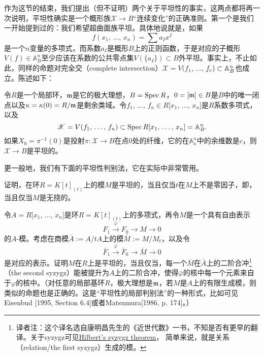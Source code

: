 作为这节的结束，我们提出（但不证明）两个关于平坦性的事实，这两点都将再一次说明，平坦性确实是一个概形族$\mathscr{X}\to B$“连续变化”的正确准则。第一个是我们一开始提到过的：我们希望超曲面族平坦。具体地说就是，如果
\[
	f(\text{$x_1$, $\dots$, $x_n$})=\sum a_I x^I
\]
是一个$n$变量的多项式，而系数$a_I$是概形$B$上的正则函数，于是对应的子概形$V(f)\in \mathbb{A}_B^n$至少应该在系数的公共零点集$V(\{a_I\})\subset B$外平坦。事实上，不止如此，同样的命题对完全交（complete intersection）$\mathscr{X}=V(f_1$, $\dots$, $f_c)\subset \mathbb{A}_B^n$也成立。陈述如下：

\begin{pro}
	令$R$是一个局部环，$\mathfrak{m}$是它的极大理想，$B=\operatorname{Spec} R$，$0=[\mathfrak{m}]\in B$是$B$中的唯一闭点以及$\kappa=\kappa(0)=R/\mathfrak{m}$是剩余类域。令$f_1$, $\dots$, $f_n\in R[x_1$, $\dots$, $x_n]$是$R$系数多项式，以及
	\[
	\mathscr{X}=V(\text{$f_1$, $\dots$, $f_n$})\subset \operatorname{Spec} R[\text{$x_1$, $\dots$, $x_n$}]=\mathbb{A}_{B}^n.
	\]
	如果$X_0=\pi^{-1}(0)$是投射$\pi:\mathscr{X}\to B$在点$0$处的纤维，它的在$\mathbb{A}_{\kappa}^n$中的余维数是$c$，则$\mathscr{X}\to B$是平坦的。
\end{pro}

更一般地，我们有下面的平坦性判别法，它在实际中非常管用。

\begin{exe}
\begin{compactenum}[(a)]
\item 证明，在环$R=K[t]_{(t)}$上的模$M$是平坦的，当且仅当$t$在$M$上不是零因子，即，当且仅当$M$是无挠的。

\item 令$A=R[x_1$, $\dots$, $x_n]$是环$R=K[t]_{(t)}$上的多项式，再令$M$是一个具有自由表示
\[
	F_1\xrightarrow{\varphi}F_0\to M\to 0
\]
的$A$\hyp 模。考虑在商模$\bar{A}:=A/tA$上的模$\bar{M}:= M/M_t$，以及令
\[
	\bar{F}_1\xrightarrow{\bar{\varphi}}\bar{F}_0\to \bar{M}\to 0
\]
是对应的表示。证明$M$在$R$上是平坦的，当且仅当，每一个$\bar{M}$在$\bar{A}$上的二阶合冲\footnote{译者注：这个译名选自康明昌先生的《近世代数》一书，不知是否有更早的翻译。关于syzygz可见\href{https://en.wikipedia.org/wiki/Hilbert\%27s_syzygy_theorem\#Sygyzies_.28relations.29}{Hilbert's syzygz theorem}， 简单来说，就是关系（relation/the first syzygz）生成的模。}（the second syzygz）能被提升为$A$上的二阶合冲，使得$\bar{\varphi}$的核中每一个元素来自于$\varphi$的核中。（对任意的局部基环$R$，极大理想是$\mathfrak{m}$，若$M$是$A$上的有限生成模，则类似的命题也是正确的。这是“平坦性的局部判别法”的一种形式，比如可见Eisenbud [1995, Section 6.4]或者Matsumura[1986, p. 174]。）
\end{compactenum}
\end{exe}


